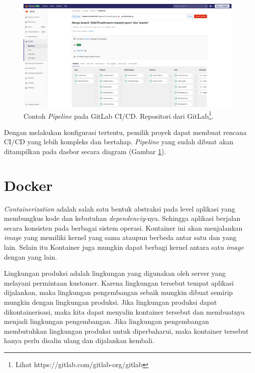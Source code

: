     
    \begin{figure}
        \begin{minipage}{\textwidth}
            \centering
            \includegraphics[width=0.7\paperwidth]{Gambar/gitlab-ci-pipeline.png}
            \caption{Contoh \textit{Pipeline} pada GitLab CI/CD. Repositori dari
            GitLab\footnote{Lihat https://gitlab.com/gitlab-org/gitlab}.}
            \label{fig:gitlab-ci:pipeline}
        \end{minipage}
    \end{figure}
    
    Dengan melakukan konfigurasi tertentu, pemilik proyek dapat membuat rencana
    CI/CD yang lebih kompleks dan bertahap. \textit{Pipeline} yang sudah dibuat
    akan ditampilkan pada dasbor secara diagram (Gambar
    \ref{fig:gitlab-ci:pipeline}).

\section{Docker}
    \textit{Containerization} adalah salah satu bentuk abstraksi pada level
    aplikasi yang membungkus kode dan kebutuhan \textit{dependenciy}-nya.
    Sehingga aplikasi berjalan secara konsisten pada berbagai sistem
    operasi\cite{docker:what-is-container}. Kontainer ini akan menjalankan
    \textit{image} yang memiliki kernel yang sama ataupun berbeda antar satu dan
    yang lain. Selain itu Kontainer juga mungkin dapat berbagi kernel antara
    satu \textit{image} dengan yang lain.
    
    Lingkungan produksi adalah lingkungan yang digunakan oleh server yang
    melayani permintaan kustomer. Karena lingkungan tersebut tempat aplikasi
    dijalankan, maka lingkungan pengembangan sebaik mungkin dibuat semirip
    mungkin dengan lingkungan produksi. Jika lingkungan produksi dapat
    dikontainerisasi, maka kita dapat menyalin kontainer tersebut dan membuatnya
    menjadi lingkungan pengembangan. Jika lingkungan pengembangan membutuhkan
    lingkungan produksi untuk diperbaharui, maka kontainer tersebut hanya perlu
    disalin ulang dan dijalankan kembali.
    
